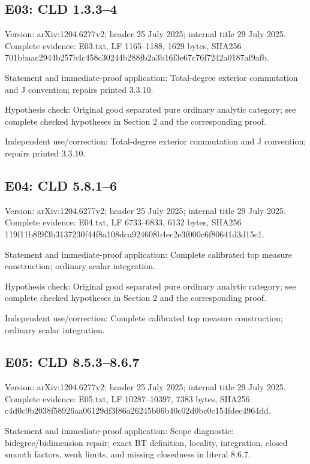 \documentclass[11pt]{article}
\begin{document}
\subsection{E03: CLD 1.3.3--4}

Version: arXiv:1204.6277v2; header 25 July 2025; internal title 29 July 2025. Complete evidence: E03.txt, LF 1165--1188, 1629 bytes, SHA256 701bbaac2944b257b4c458c30244b288fb2a3b16f3e67c76f7242a0187af9afb.

Statement and immediate-proof application: Total-degree exterior commutation and J convention; repairs printed 3.3.10.

Hypothesis check: Original good separated pure ordinary analytic category; see complete checked hypotheses in Section 2 and the corresponding proof.

Independent use/correction: Total-degree exterior commutation and J convention; repairs printed 3.3.10.

\subsection{E04: CLD 5.8.1--6}

Version: arXiv:1204.6277v2; header 25 July 2025; internal title 29 July 2025. Complete evidence: E04.txt, LF 6733--6833, 6132 bytes, SHA256 119f11b8f9f3b3137230f44f8a108dca924608b4ec2e3f000c6f80641d3d15c1.

Statement and immediate-proof application: Complete calibrated top measure construction; ordinary scalar integration.

Hypothesis check: Original good separated pure ordinary analytic category; see complete checked hypotheses in Section 2 and the corresponding proof.

Independent use/correction: Complete calibrated top measure construction; ordinary scalar integration.

\subsection{E05: CLD 8.5.3--8.6.7}

Version: arXiv:1204.6277v2; header 25 July 2025; internal title 29 July 2025. Complete evidence: E05.txt, LF 10287--10397, 7383 bytes, SHA256 c4d0c9b2038f58926aa06129df3f86a26245b06b40c02d0bc0c154fdec4964dd.

Statement and immediate-proof application: Scope diagnostic: bidegree/bidimension repair; exact BT definition, locality, integration, closed smooth factors, weak limits, and missing closedness in literal 8.6.7.
\end{document}
